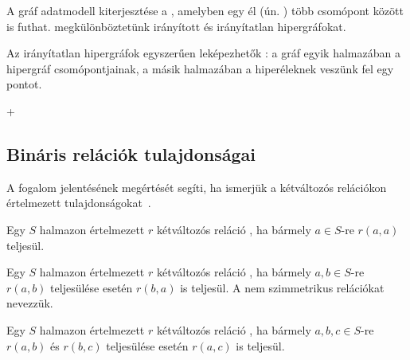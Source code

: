 A gráf adatmodell kiterjesztése a , amelyben egy él (ún. ) több csomópont között is futhat. megkülönböztetünk irányított és irányítatlan hipergráfokat.

Az irányítatlan hipergráfok egyszerűen leképezhetők : a gráf egyik halmazában a hipergráf csomópontjainak, a másik halmazában a hiperéleknek veszünk fel egy pontot.

 + 


\subsection{Bináris relációk tulajdonságai}

A  fogalom jelentésének megértését segíti, ha ismerjük a kétváltozós relációkon értelmezett tulajdonságokat~\cite{wiki:relacio}.


\begin{definicio}
	Egy $S$ halmazon értelmezett $r$ kétváltozós reláció , ha bármely $a \in S$-re $r(a, a)$ teljesül.
\end{definicio}

\begin{definicio}
	Egy $S$ halmazon értelmezett $r$ kétváltozós reláció , ha bármely $a,b \in S$-re $r(a, b)$ teljesülése esetén $r(b, a)$ is teljesül. A nem szimmetrikus relációkat  nevezzük.
\end{definicio}

\begin{definicio}
	Egy $S$ halmazon értelmezett $r$ kétváltozós reláció , ha bármely $a,b,c \in S$-re $r(a, b)$ és $r(b, c)$ teljesülése esetén $r(a, c)$ is teljesül.
\end{definicio}

